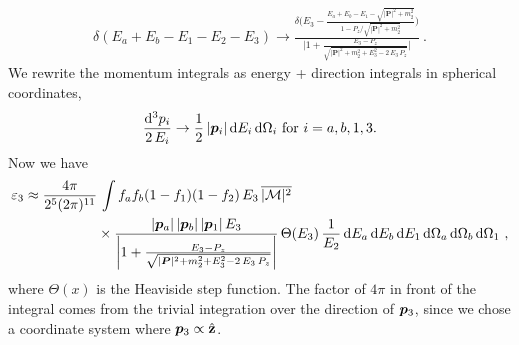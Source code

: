 \begin{align}
    \delta(E_a + E_b - E_1 - E_2 - E_3) 
    \rightarrow 
    \frac{\delta\bigg(
        E_3 -     
        \frac{E_a + E_b - E_1 - \sqrt{|\bm{P}|^2 + m_2^2}}{1 - P_z / \sqrt{|\bm{P}|^2 + m_2^2}}
    \bigg)}
    {
    \bigg|
        1 + \frac{E_3 - P_z}{\sqrt{|\bm{P}|^2 + m_2^2 + E_3^2 - 2 \, E_3 \, P_z}}
    \bigg|
    } \ .
\end{align}
We rewrite the momentum integrals as energy + direction integrals in spherical coordinates, 
\begin{align}
    \frac{\dd^3 p_i}{2 \, E_i} \rightarrow
    \frac{1}{2} \, \pmag[i] \, \dd E_i \, \dd \Omega_i \ \text{for } i = a, b, 1, 3. 
\end{align}
Now we have
\begin{equation}
    \begin{aligned}
        \label{eq:dumb-approximate-integral}
        \varepsilon_3 \approx 
        \frac{4 \pi}{2^5 (2\pi)^{11}} &
        \, \int 
        f_a f_b (1 - f_1) (1 - f_2)
        \, E_3
        \, \overline{|\mathcal{M}|^2} \\
        & \times
        \frac{
            \pmag[a] 
            \, \pmag[b]
            \, \pmag[1]
            \, E_3
            }{
                \bigg|
                1 + \frac{E_3 - P_z}{\sqrt{|\bm{P}|^2 + m_2^2 + E_3^2 - 2 \, E_3 \, P_z}}
                \bigg|
            }
        \, \Theta(E_3)
        \, \frac{1}{E_2}
        \, \dd E_a 
        \, \dd E_b
        \, \dd E_1
        \, \dd \Omega_a
        \, \dd \Omega_b
        \, \dd \Omega_1
        \ ,
    \end{aligned}
\end{equation}
where $\Theta(x)$ is the Heaviside step function. The factor of $4\pi$ in front of the integral comes from the trivial integration over the direction of $\pvec[3]$, since we chose a coordinate system where $\pvec[3] \propto \hat{\mathbf{z}}$.
